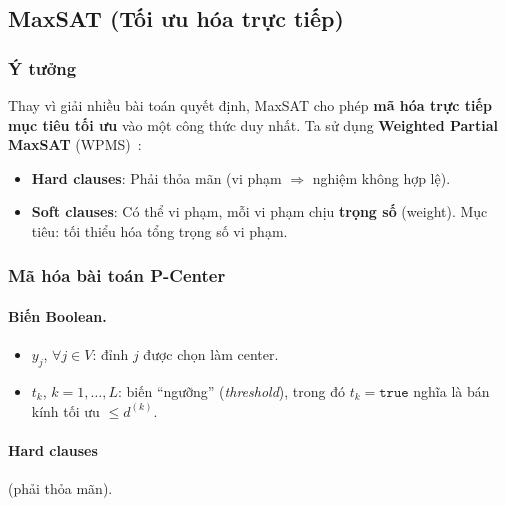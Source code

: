 \documentclass[11pt,a4paper]{article}
\begin{document}
\subsection{MaxSAT (Tối ưu hóa trực tiếp)}
\label{sec:maxsat}

\subsubsection{Ý tưởng}

Thay vì giải nhiều bài toán quyết định, MaxSAT cho phép \textbf{mã hóa trực tiếp mục tiêu tối ưu} vào một công thức duy nhất.
Ta sử dụng \textbf{Weighted Partial MaxSAT} (WPMS)~\cite{li2021maxsat}:
\begin{itemize}[nosep]
    \item \textbf{Hard clauses}: Phải thỏa mãn (vi phạm $\Rightarrow$ nghiệm không hợp lệ).
    \item \textbf{Soft clauses}: Có thể vi phạm, mỗi vi phạm chịu \textbf{trọng số} (weight). Mục tiêu: tối thiểu hóa tổng trọng số vi phạm.
\end{itemize}

\subsubsection{Mã hóa bài toán P-Center}

\paragraph{Biến Boolean.}
\begin{itemize}[nosep]
    \item $y_j$, $\forall j \in V$: đỉnh $j$ được chọn làm center.
    \item $t_k$, $k = 1, \dots, L$: biến ``ngưỡng'' (\textit{threshold}), trong đó $t_k = \texttt{true}$ nghĩa là bán kính tối ưu $\le d^{(k)}$.
\end{itemize}

\paragraph{Hard clauses} (phải thỏa mãn).
\end{document}
